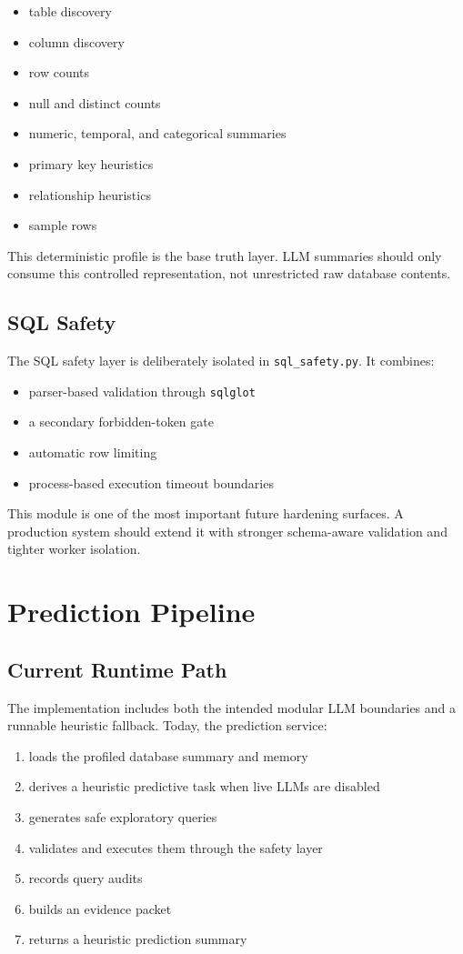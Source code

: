 \documentclass[11pt]{book}
\begin{document}
\begin{itemize}
\item table discovery
\item column discovery
\item row counts
\item null and distinct counts
\item numeric, temporal, and categorical summaries
\item primary key heuristics
\item relationship heuristics
\item sample rows
\end{itemize}

This deterministic profile is the base truth layer. LLM summaries should only consume this
controlled representation, not unrestricted raw database contents.

\section{SQL Safety}
The SQL safety layer is deliberately isolated in \texttt{sql\_safety.py}. It combines:

\begin{itemize}
\item parser-based validation through \texttt{sqlglot}
\item a secondary forbidden-token gate
\item automatic row limiting
\item process-based execution timeout boundaries
\end{itemize}

This module is one of the most important future hardening surfaces. A production system should
extend it with stronger schema-aware validation and tighter worker isolation.

\chapter{Prediction Pipeline}
\section{Current Runtime Path}
The implementation includes both the intended modular LLM boundaries and a runnable heuristic
fallback. Today, the prediction service:

\begin{enumerate}
\item loads the profiled database summary and memory
\item derives a heuristic predictive task when live LLMs are disabled
\item generates safe exploratory queries
\item validates and executes them through the safety layer
\item records query audits
\item builds an evidence packet
\item returns a heuristic prediction summary
\end{enumerate}
\end{document}
